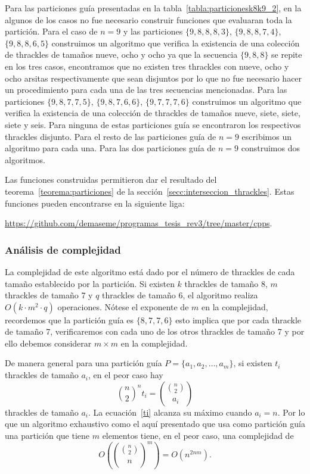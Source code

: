   Para las particiones guía presentadas en la tabla~\ref{tabla:particionesk8k9_2}, en la
  algunos de los casos no fue necesario construir funciones que evaluaran toda la
  partición. Para el caso de $n=9$ y las particiones $\{9,8,8,8,3\}$, $\{9,8,8,7,4\}$, $\{9,8,8,6,5\}$
  construimos un algoritmo que verifica la existencia de una colección de thrackles de tamaños
  nueve, ocho y ocho ya que la secuencia $\{9,8,8\}$ se repite en los tres casos, encontramos que no existen tres thrackles con nueve, ocho y ocho arsitas respectivamente que sean disjuntos por lo que no fue necesario hacer un procedimiento para cada una de las tres secuencias mencionadas. Para las particiones $\{9,8,7,7,5\}$, $\{9,8,7,6,6\}$, $\{9,7,7,7,6\}$ construimos
  un algoritmo que verifica la existencia de una colección de thrackles de tamaños nueve, siete,
  siete, siete y seis. Para ninguna de estas particiones guía se encontraron los respectivos thrackles disjunto. Para el resto de las particiones guía de $n=9$ escribimos un algoritmo para
  cada una. Para las dos particiones guía de $n=9$ construimos dos algoritmos.

  Las funciones construidas permitieron dar el resultado del
  teorema~\ref{teorema:particiones} de la sección~\ref{secc:interseccion_thrackles}.
  Estas funciones pueden encontrarse en la siguiente liga:

  \url{https://github.com/demaseme/programas_tesis_rev3/tree/master/cpps}.

  \subsubsection{Análisis de complejidad}
  La complejidad de este algoritmo está dado por el número de thrackles de cada
  tamaño establecido por la partición. Si existen $k$ thrackles de tamaño 8, $m$
  thrackles de tamaño 7 y $q$ thrackles de tamaño 6, el algoritmo realiza $O(k\cdot
  m^2 \cdot q)$ operaciones. Nótese el exponente de $m$ en la complejidad, recordemos que
  la partición guía es $\{8,7,7,6\}$ esto implica que por cada thrackle de tamaño 7, verificaremos
  con cada uno de los otros thrackles de tamaño 7 y por ello debemos considerar $m\times m$ en la
  complejidad.

  De manera general para una partición guía $P=\{a_1,a_2,\dots,a_m\}$, si existen $t_i$
  thrackles de tamaño $a_i$, en el peor caso hay
  \begin{equation} \label{ti}
    \binom{n}{2}^n t_i=\displaystyle \binom{\binom{n}{2}}{a_i}
  \end{equation}
  thrackles de tamaño $a_i$. La ecuación~\ref{ti} alcanza su máximo cuando $a_i=n$. Por lo que
  un algoritmo exhaustivo como el aquí presentado que usa como partición guía una partición que tiene
  $m$ elementos tiene, en el peor caso, una complejidad de
  \[O\left(\binom{\binom{n}{2}}{n}^m\right) = O(n^{2nm}). \]

